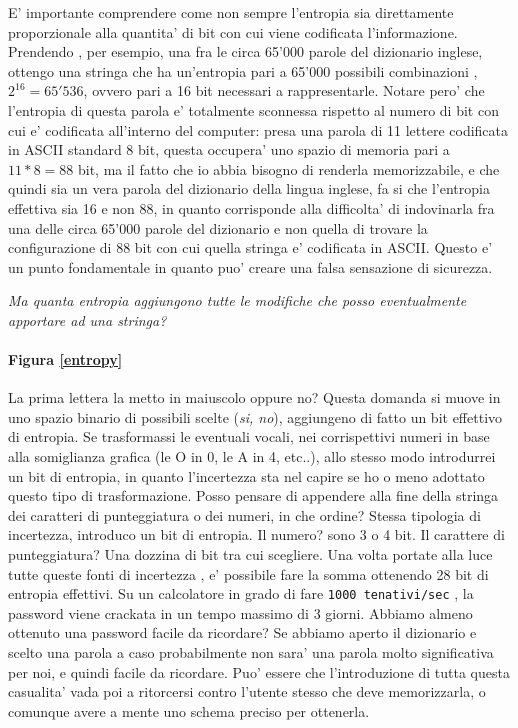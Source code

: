 E' importante comprendere come non sempre l'entropia sia direttamente proporzionale alla quantita' di bit con cui viene codificata l'informazione. Prendendo , per esempio, una fra le circa 65'000 parole del dizionario inglese, ottengo una stringa che ha un'entropia pari a 65'000 possibili combinazioni , $ 2^{16} = 65'536 $, ovvero pari a 16 bit necessari a rappresentarle. Notare pero' che l'entropia di questa parola e' totalmente sconnessa rispetto al numero di bit con cui e' codificata all'interno del computer: presa una parola di 11 lettere codificata in ASCII standard 8 bit, questa occupera' uno spazio di memoria pari a $11 * 8 = 88$ bit, ma il fatto che io abbia bisogno di renderla memorizzabile, e che quindi sia un vera parola del dizionario della lingua inglese, fa si che l'entropia effettiva sia 16 e non 88, in quanto corrisponde alla difficolta' di indovinarla fra una delle circa 65'000 parole del dizionario e non quella di trovare la configurazione di 88 bit con cui quella stringa e' codificata in ASCII. Questo e' un punto fondamentale in quanto puo' creare una falsa sensazione di sicurezza.
\begin{center}
	\emph{Ma quanta entropia aggiungono tutte le modifiche che posso eventualmente apportare ad una stringa?}
\end{center}
\paragraph{Figura \ref{entropy}}
La prima lettera la metto in maiuscolo oppure no? Questa domanda si muove in uno spazio binario di possibili scelte (\emph{si, no}), aggiungeno di fatto un bit effettivo di entropia. Se trasformassi le eventuali vocali, nei corrispettivi numeri in base alla somiglianza grafica (le O in 0, le A in 4, etc..), allo stesso modo introdurrei un bit di entropia, in quanto l'incertezza sta nel capire se ho o meno adottato questo tipo di trasformazione. Posso pensare di appendere alla fine della stringa dei caratteri di punteggiatura o dei numeri, in che ordine? Stessa tipologia di incertezza, introduco un bit di entropia. Il numero? sono 3 o 4 bit. Il carattere di punteggiatura? Una dozzina di bit tra cui scegliere. Una volta portate alla luce tutte queste fonti di incertezza , e' possibile fare la somma ottenendo 28 bit di entropia effettivi. Su un calcolatore in grado di fare \texttt{1000 tenativi/sec} , la password viene crackata in un tempo massimo di 3 giorni.
Abbiamo almeno ottenuto una password facile da ricordare? Se abbiamo aperto il dizionario e scelto una parola a caso probabilmente non sara' una parola molto significativa per noi, e quindi facile da ricordare. Puo' essere che l'introduzione di tutta questa casualita' vada poi a ritorcersi contro l'utente stesso che deve memorizzarla, o comunque avere a mente uno schema preciso per ottenerla. 

